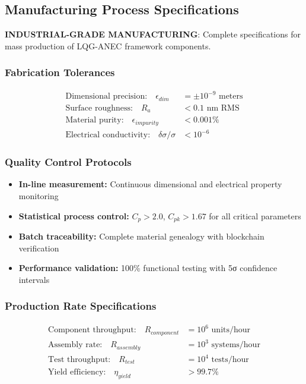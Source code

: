 \documentclass[11pt]{article}
\begin{document}
\subsection{Manufacturing Process Specifications}
\textbf{INDUSTRIAL-GRADE MANUFACTURING}: Complete specifications for mass production of LQG-ANEC framework components.

\subsubsection{Fabrication Tolerances}
\begin{align}
\text{Dimensional precision:} \quad \epsilon_{dim} &= \pm 10^{-9} \text{ meters} \\
\text{Surface roughness:} \quad R_a &< 0.1 \text{ nm RMS} \\
\text{Material purity:} \quad \epsilon_{impurity} &< 0.001\% \\
\text{Electrical conductivity:} \quad \delta\sigma/\sigma &< 10^{-6}
\end{align}

\subsubsection{Quality Control Protocols}
\begin{itemize}
\item \textbf{In-line measurement:} Continuous dimensional and electrical property monitoring
\item \textbf{Statistical process control:} $C_p > 2.0$, $C_{pk} > 1.67$ for all critical parameters
\item \textbf{Batch traceability:} Complete material genealogy with blockchain verification
\item \textbf{Performance validation:} 100\% functional testing with 5σ confidence intervals
\end{itemize}

\subsubsection{Production Rate Specifications}
\begin{align}
\text{Component throughput:} \quad R_{component} &= 10^6 \text{ units/hour} \\
\text{Assembly rate:} \quad R_{assembly} &= 10^3 \text{ systems/hour} \\
\text{Test throughput:} \quad R_{test} &= 10^4 \text{ tests/hour} \\
\text{Yield efficiency:} \quad \eta_{yield} &> 99.7\%
\end{align}
\end{document}
